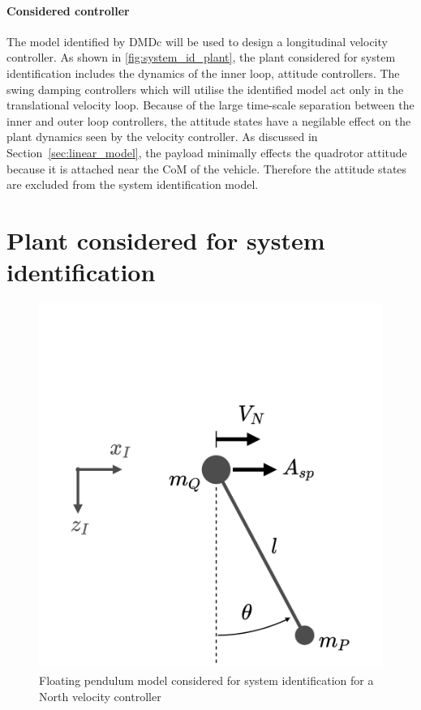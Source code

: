         \paragraph{Considered controller}
        The model identified by DMDc will be used to design a longitudinal velocity controller.
        As shown in \ref{fig:system_id_plant}, the plant considered for system identification includes the dynamics of the inner loop, attitude controllers.
        The swing damping controllers which will utilise the identified model act only in the translational velocity loop.
        Because of the large time-scale separation between the inner and outer loop controllers, 
        the attitude states have a negilable effect on the plant dynamics seen by the velocity controller.
        As discussed in Section~\ref{sec:linear_model}, the payload minimally effects the quadrotor attitude because it is attached near the CoM of the vehicle.
        Therefore the attitude states are excluded from the system identification model.

\section{Plant considered for system identification}
        \begin{figure}[h]
            \centering
            \includegraphics[width=0.5\linewidth]{floating_pend.png}            
            \caption{Floating pendulum model considered for system identification for a North velocity controller}
            \label{fig:floating_pend}
        \end{figure}
    
